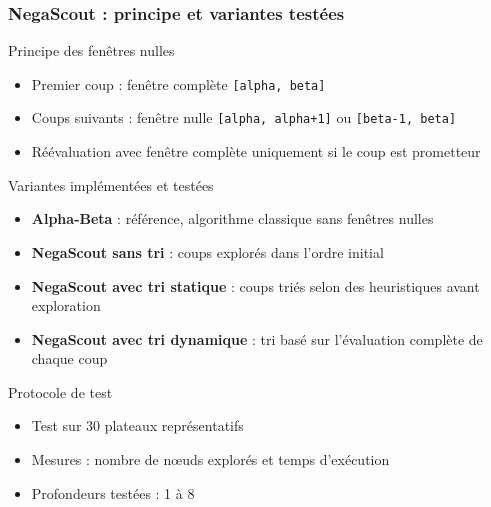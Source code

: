 \documentclass{beamer}
\begin{document}
\begin{frame}
    \frametitle{NegaScout : principe et variantes testées}
    
    \begin{block}{Principe des fenêtres nulles}
    \scriptsize
    \begin{itemize}
        \item Premier coup : fenêtre complète \texttt{[alpha, beta]}
        \item Coups suivants : fenêtre nulle \texttt{[alpha, alpha+1]} ou \texttt{[beta-1, beta]}
        \item Réévaluation avec fenêtre complète uniquement si le coup est prometteur
    \end{itemize}
    \end{block}

    \begin{block}{Variantes implémentées et testées}
    \scriptsize
    \begin{itemize}
        \item \textbf{Alpha-Beta} : référence, algorithme classique sans fenêtres nulles
        \item \textbf{NegaScout sans tri} : coups explorés dans l'ordre initial
        \item \textbf{NegaScout avec tri statique} : coups triés selon des heuristiques avant exploration
        \item \textbf{NegaScout avec tri dynamique} : tri basé sur l'évaluation complète de chaque coup
    \end{itemize}
    \end{block}
    
    \begin{block}{Protocole de test}
    \scriptsize
    \begin{itemize}
        \item Test sur 30 plateaux représentatifs
        \item Mesures : nombre de nœuds explorés et temps d'exécution
        \item Profondeurs testées : 1 à 8
    \end{itemize}
    \end{block}
\end{frame}
\end{document}
